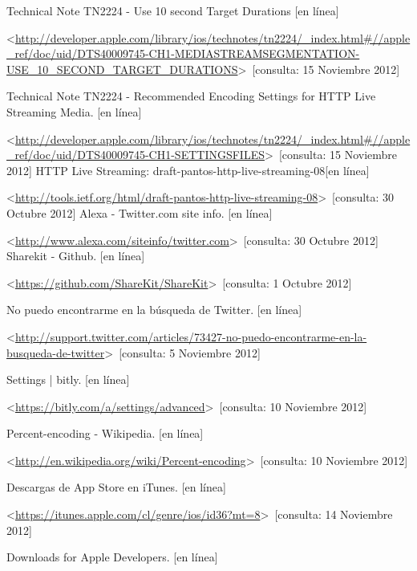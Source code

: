 \begin{thebibliography}{99}
\begin{sloppypar}
Technical Note TN2224 - Use 10 second Target Durations [en línea]\

\textless \url{http://developer.apple.com/library/ios/technotes/tn2224/_index.html\#//apple_ref/doc/uid/DTS40009745-CH1-MEDIASTREAMSEGMENTATION-USE_10_SECOND_TARGET_DURATIONS}\textgreater \ [consulta: 15 Noviembre 2012]

Technical Note TN2224 - Recommended Encoding Settings for HTTP Live Streaming Media. [en línea]\

\textless \url{http://developer.apple.com/library/ios/technotes/tn2224/_index.html\#//apple_ref/doc/uid/DTS40009745-CH1-SETTINGSFILES}\textgreater \ [consulta: 15 Noviembre 2012]
HTTP Live Streaming: draft-pantos-http-live-streaming-08[en línea]\

\textless \url{http://tools.ietf.org/html/draft-pantos-http-live-streaming-08}\textgreater \ [consulta: 30 Octubre 2012]
%
Alexa - Twitter.com site info. [en línea]\

\textless \url{http://www.alexa.com/siteinfo/twitter.com}\textgreater \ [consulta: 30 Octubre 2012] 
%
Sharekit - Github. [en línea]\

\textless \url{https://github.com/ShareKit/ShareKit}\textgreater \ [consulta: 1 Octubre 2012] 

%
No puedo encontrarme en la búsqueda de Twitter. [en línea]

\textless \url{http://support.twitter.com/articles/73427-no-puedo-encontrarme-en-la-busqueda-de-twitter}\textgreater \ [consulta: 5 Noviembre 2012] 

%
Settings | bitly. [en línea]\

\textless \url{https://bitly.com/a/settings/advanced}\textgreater \ [consulta: 10 Noviembre 2012] 

%
Percent-encoding - Wikipedia. [en línea]\

\textless \url{http://en.wikipedia.org/wiki/Percent-encoding}\textgreater \ [consulta: 10 Noviembre 2012] 

%
Descargas de App Store en iTunes. [en línea]\

\textless \url{https://itunes.apple.com/cl/genre/ios/id36?mt=8}\textgreater \ [consulta: 14 Noviembre 2012] 

%
Downloads for Apple Developers. [en línea]\


\end{sloppypar}
\end{thebibliography}
